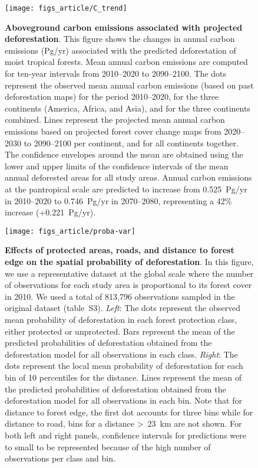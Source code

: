 \documentclass[
  12pt,
]{article}
\begin{document}
\begin{figure}[H]

{\centering \texttt{[image: figs\_article/C\_trend]} 

}

\caption{\textbf{Aboveground carbon emissions associated with projected deforestation}. This figure shows the changes in annual carbon emissions (Pg/yr) associated with the predicted deforestation of moist tropical forests. Mean annual carbon emissions are computed for ten-year intervals from 2010--2020 to 2090--2100. The dots represent the observed mean annual carbon emissions (based on past deforestation maps) for the period 2010--2020, for the three continents (America, Africa, and Asia), and for the three continents combined. Lines represent the projected mean annual carbon emissions based on projected forest cover change maps from 2020--2030 to 2090--2100 per continent, and for all continents together. The confidence envelopes around the mean are obtained using the lower and upper limits of the confidence intervals of the mean annual deforested areas for all study areas. Annual carbon emissions at the pantropical scale are predicted to increase from 0.525~Pg/yr in 2010--2020 to 0.746~Pg/yr in 2070--2080, representing a 42\% increase (+0.221~Pg/yr).}\label{fig:c-em}
\end{figure}



\begin{figure}[H]

{\centering \texttt{[image: figs\_article/proba-var]} 

}

\caption{\textbf{Effects of protected areas, roads, and distance to forest edge on the spatial probability of deforestation}. In this figure, we use a representative dataset at the global scale where the number of observations for each study area is proportional to its forest cover in 2010. We used a total of 813,796 observations sampled in the original dataset (table~S3). \emph{Left}: The dots represent the observed mean probability of deforestation in each forest protection class, either protected or unprotected. Bars represent the mean of the predicted probabilities of deforestation obtained from the deforestation model for all observations in each class. \emph{Right}: The dots represent the local mean probability of deforestation for each bin of 10 percentiles for the distance. Lines represent the mean of the predicted probabilities of deforestation obtained from the deforestation model for all observations in each bin. Note that for distance to forest edge, the first dot accounts for three bins while for distance to road, bins for a distance \textgreater~23~km are not shown. For both left and right panels, confidence intervals for predictions were to small to be represented because of the high number of observations per class and bin.}\label{fig:proba-var}
\end{figure}
\end{document}
